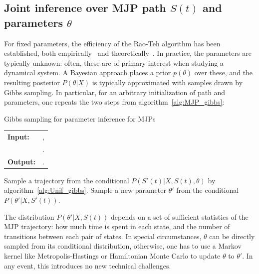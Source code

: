 \subsection{Joint inference over MJP path $S(t)$ and parameters $\theta$}
For fixed parameters, the efficiency of the Rao-Teh algorithm has been established, both empirically~\citep{RaoTeh13} and theoretically~\citep{miasojedow2017}.
In practice, the parameters are typically unknown: often, these are of primary interest when studying a dynamical system. 
A Bayesian approach
places a prior $p(\theta)$ over these, and the
resulting posterior $P(\theta|X)$ is typically approximated
with samples drawn by Gibbs sampling. In particular, for an arbitrary 
initialization of path and  parameters, one repeats the
two steps from algorithm~\ref{alg:MJP_gibbs}:
\begin{algorithm}[H]
  \caption{Gibbs sampling for parameter inference for MJPs}
   \label{alg:MJP_gibbs}
  \begin{tabular}{l l}
   \textbf{Input:  } & \text{A set of partial and noisy observations $X$}, \\
                      & \text{The previous MJP path $S(t) = (S, T)$, the previous MJP parameters $\theta$}.\\ 
   \textbf{Output:  }& \text{A new MJP trajectory $S' (t) = (S', T')$, 
                            new MJP parameters $\theta'$}.\\
   \hline
   \end{tabular}
   \begin{algorithmic}[1]
  \State  Sample a trajectory from the conditional 
  $P(S'(t)|X,S(t),\theta)$ by 
  algorithm~\ref{alg:Unif_gibbs}.
  \State Sample a new parameter $\theta'$ from the conditional 
    $P(\theta'|X,S'(t))$.
   \end{algorithmic}
\end{algorithm} 
The distribution $P(\theta'|X,S(t))$ depends on a set of sufficient statistics of the 
MJP trajectory: how
much time is spent in each state, and the number of transitions
between each pair of states. 
In special circumstances, $\theta$ can be directly sampled from its 
conditional distribution, otherwise, one has to use a Markov kernel like
Metropolis-Hastings or Hamiltonian Monte Carlo to update $\theta$ to 
$\theta'$. In any event, this introduces no new technical challenges.
